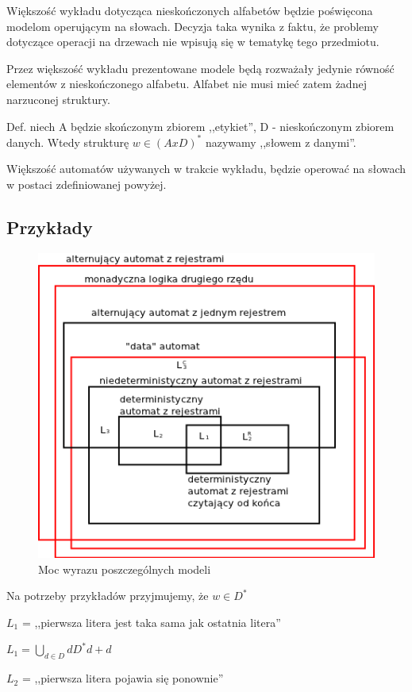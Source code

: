 \documentclass[a4paper,12pt]{report}
\begin{document}
Większość wykładu dotycząca nieskończonych alfabetów będzie poświęcona modelom operującym na słowach. Decyzja taka wynika z faktu, że problemy dotyczące operacji na drzewach nie wpisują się w tematykę tego przedmiotu.

Przez większość wykładu prezentowane modele będą rozważały jedynie równość elementów z nieskończonego alfabetu. Alfabet nie musi mieć zatem żadnej narzuconej struktury.

Def. niech A będzie skończonym zbiorem ,,etykiet'', D - nieskończonym zbiorem danych. Wtedy strukturę $w \in (A x D)^*$ nazywamy ,,słowem z danymi''.

Większość automatów używanych w trakcie wykładu, będzie operować na słowach w postaci zdefiniowanej powyżej.

\subsection{Przykłady}
\begin{figure}
\begin{center}
\includegraphics{images/podzial_automatow.png}
\end{center}
\caption{Moc wyrazu poszczególnych modeli}
\end{figure}
Na potrzeby przykładów przyjmujemy, że $ w \in D^* $

$L_1$ = ,,pierwsza litera jest taka sama jak ostatnia litera''

$L_1 = {\bigcup \limits _{d \in D} dD^*d + d}$

$L_2$ = ,,pierwsza litera pojawia się ponownie''
\end{document}
